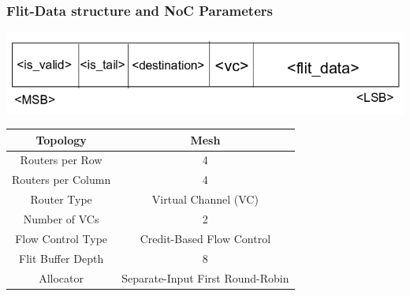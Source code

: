 \begin{frame}
  \frametitle{Flit-Data structure and NoC Parameters}   %
  \begin{center}

  \includegraphics[scale=0.4]{./diagram/flit_structure} 
  \end{center}

\begin{table} [!h]
  \begin{center}
 \resizebox{0.7\textwidth}{!}
	{\begin{tabular}{||c | c||} 
 \hline
    Topology & Mesh \\ \hline
    Routers per Row & 4 \\
    Routers per Column & 4\\
    Router Type & Virtual Channel (VC) \\
    Number of VCs & 2 \\
    Flow Control Type & Credit-Based Flow Control \\
    Flit Buffer Depth & 8 \\
    Allocator & Separate-Input First Round-Robin \\
 \hline
\end{tabular}}
\end{center}

\label{noc_parameters}

\end{table}
\end {frame}



